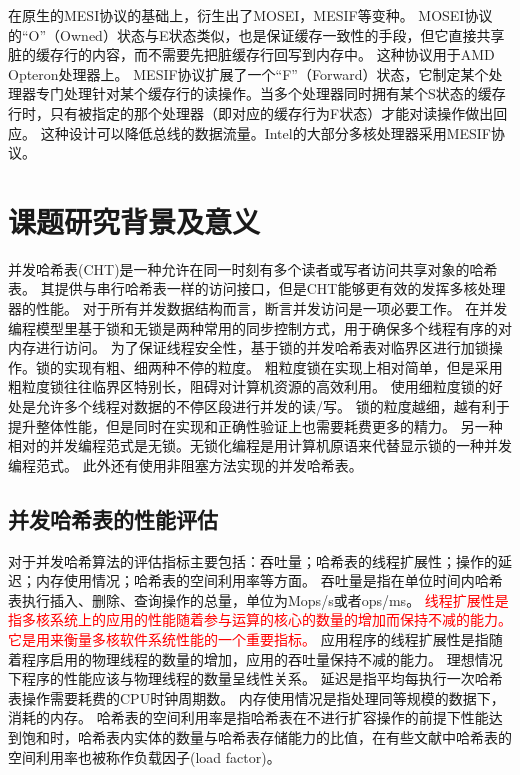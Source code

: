 在原生的MESI协议的基础上，衍生出了MOSEI，MESIF等变种。
MOSEI协议的“O”（Owned）状态与E状态类似，也是保证缓存一致性的手段，但它直接共享脏的缓存行的内容，而不需要先把脏缓存行回写到内存中。
这种协议用于AMD Opteron处理器上。
MESIF协议扩展了一个“F”（Forward）状态，它制定某个处理器专门处理针对某个缓存行的读操作。当多个处理器同时拥有某个S状态的缓存行时，只有被指定的那个处理器（即对应的缓存行为F状态）才能对读操作做出回应。
这种设计可以降低总线的数据流量。Intel的大部分多核处理器采用MESIF协议。 

\section{课题研究背景及意义}

并发哈希表(CHT)是一种允许在同一时刻有多个读者或写者访问共享对象的哈希表。
其提供与串行哈希表一样的访问接口，但是CHT能够更有效的发挥多核处理器的性能。
对于所有并发数据结构而言，断言并发访问是一项必要工作。
在并发编程模型里基于锁和无锁是两种常用的同步控制方式，用于确保多个线程有序的对内存进行访问。
为了保证线程安全性，基于锁的并发哈希表对临界区进行加锁操作。锁的实现有粗、细两种不停的粒度。
粗粒度锁在实现上相对简单，但是采用粗粒度锁往往临界区特别长，阻碍对计算机资源的高效利用。
使用细粒度锁的好处是允许多个线程对数据的不停区段进行并发的读/写。
锁的粒度越细，越有利于提升整体性能，但是同时在实现和正确性验证上也需要耗费更多的精力。
另一种相对的并发编程范式是无锁。无锁化编程是用计算机原语来代替显示锁的一种并发编程范式。
此外还有使用非阻塞方法实现的并发哈希表\cite{nonblocking,clht,shalev2006split}。

\subsection{并发哈希表的性能评估}
 
对于并发哈希算法的评估指标主要包括：吞吐量；哈希表的线程扩展性；操作的延迟；内存使用情况；哈希表的空间利用率等方面。
吞吐量是指在单位时间内哈希表执行插入、删除、查询操作的总量，单位为Mops/s或者ops/ms。
\textcolor{red}{线程扩展性是指多核系统上的应用的性能随着参与运算的核心的数量的增加而保持不减的能力。它是用来衡量多核软件系统性能的一个重要指标。}
应用程序的线程扩展性是指随着程序启用的物理线程的数量的增加，应用的吞吐量保持不减的能力。
理想情况下程序的性能应该与物理线程的数量呈线性关系。
延迟是指平均每执行一次哈希表操作需要耗费的CPU时钟周期数。
内存使用情况是指处理同等规模的数据下，消耗的内存。
哈希表的空间利用率是指哈希表在不进行扩容操作的前提下性能达到饱和时，哈希表内实体的数量与哈希表存储能力的比值，在有些文献中哈希表的空间利用率也被称作负载因子(load factor)。

